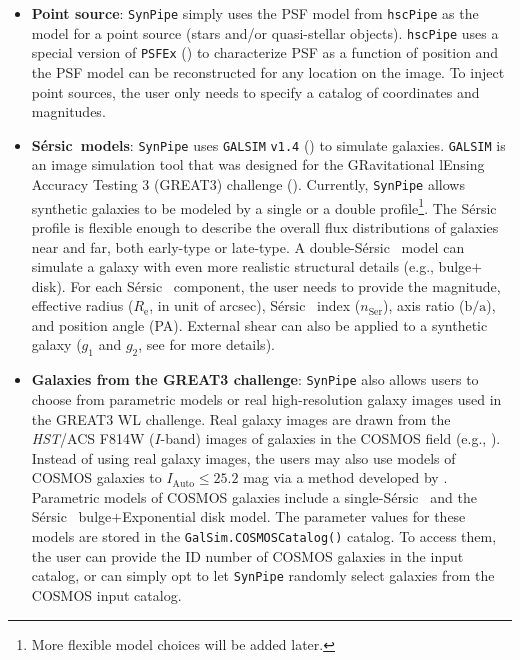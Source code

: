 \documentclass[useamsfonts]{pasj01}
\def\ser{{S\'{e}rsic\ }}
\def\hscpipe{\texttt{hscPipe}}
\def\synpipe{\texttt{SynPipe}}
\def\galsim{\texttt{G}{\scriptsize \texttt{AL}}\texttt{S}{\scriptsize \texttt{IM}}}
\def\hst{{\textit{HST}}}
\begin{document}
    \begin{itemize}

        \item \textbf{Point source}: \synpipe{} simply uses the PSF model from \hscpipe{} as the model for
            a point source (stars and/or quasi-stellar objects).
            \hscpipe{} uses a special version of \texttt{PSFEx}
            (\citealt{Bertin2011, Bertin2013}) to characterize PSF as a function
            of position and the PSF model can be reconstructed
            for any location on the image. To inject point sources, the user only needs to specify a catalog of coordinates and magnitudes.
        \item \textbf{\ser{}models}:
            \texttt{SynPipe} uses \galsim{} \texttt{v1.4} (\citealt{Rowe2015}) to
            simulate galaxies.
            \galsim{} is an image simulation tool that was designed for the GRavitational lEnsing Accuracy Testing 3 (GREAT3) challenge
            (\citealt{Mandelbaum2014}). Currently, \synpipe{} allows synthetic galaxies to be modeled by a single
            or a double \citet{Sersic1963}
            profile\footnote{More flexible model choices will be added later.}. The \ser{} profile is flexible enough to describe the overall flux
            distributions of galaxies near and far, both early-type or late-type.
            A double-\ser{} model can simulate a galaxy with even more realistic
            structural details (e.g., bulge$+$disk).
            For each \ser{} component, the user needs to provide the magnitude,
            effective radius ($R_{\mathrm{e}}$, in unit of arcsec), \ser{} index
            ($n_{\mathrm{Ser}}$), axis ratio ($\mathrm{b}/\mathrm{a}$), and position
            angle (PA).
            External shear can also be applied to a synthetic galaxy ($g_1$ and
            $g_2$, see \citealt{Rowe2015} for more details).
        \item \textbf{Galaxies from the GREAT3 challenge}: \synpipe{} also allows users to choose from parametric models or real
            high-resolution galaxy images used in the GREAT3 WL challenge. Real galaxy images are drawn from the \hst{}/ACS F814W ($I$-band) images of galaxies
            in the COSMOS field (e.g., \citealt{Scoville2007,Leauthaud2007}). Instead of using real galaxy images, the users may also use models of  COSMOS galaxies to $I_{\mathrm{Auto}}\leq25.2$ mag via a method developed by
            \citet{Lackner2012}.  Parametric models of COSMOS galaxies include a single-\ser{} and the \ser{}
            bulge$+$Exponential disk model. The parameter values for these models are stored in the
            \texttt{GalSim.COSMOSCatalog()} catalog.
            To access them, the user can provide the ID number of COSMOS galaxies
            in the input catalog, or can simply opt to let \synpipe{} randomly select galaxies from the COSMOS input catalog.
    \end{itemize}
\end{document}
